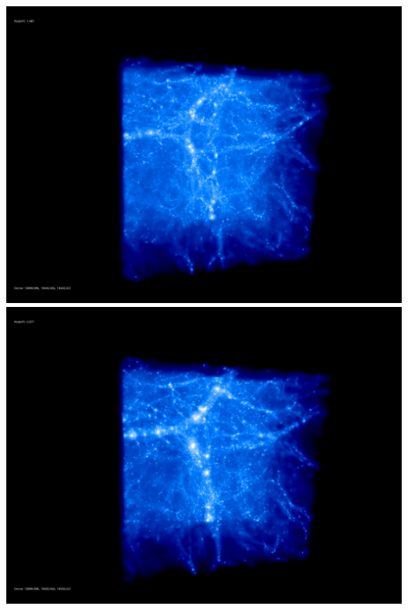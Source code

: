 \includegraphics[scale=0.1]{r256/h100/stages_50/50.jpg} 
\includegraphics[scale=0.1]{r256/h100/stages_50/100.jpg}  \\


